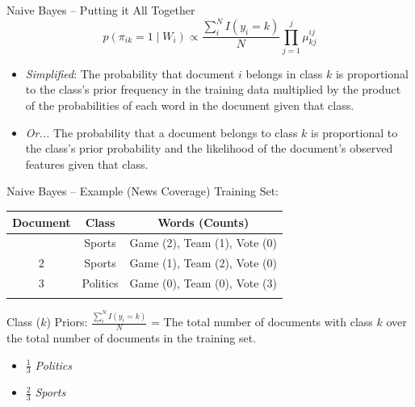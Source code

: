 \documentclass[
  ignorenonframetext,
  aspectratio=169]{beamer}
\begin{document}
\begin{frame}{Naive Bayes -- Putting it All Together}
\label{naive-bayes-putting-it-all-together}
\[p(\pi_{ik}=1\mid W_i) \propto \frac{\sum^N_i I(y_i=k)}{N} \prod^j_{j=1} \mu_{kj}^{ij}\]
\vspace{2.5mm}

\begin{itemize}
\item \textit{Simplified}: The probability that document $i$ belongs in class $k$ is proportional to the class's prior frequency in the training data multiplied by the product of the probabilities of each word in the document given that class.  \vspace{2.5mm}
\item \textit{Or...} The probability that a document belongs to class $k$ is proportional to the class's prior probability and the likelihood of the document's observed features given that class.
\end{itemize}
\end{frame}

\begin{frame}{Naive Bayes -- Example (News Coverage)}
\label{naive-bayes-example-news-coverage}
Training Set: \vspace{2.5mm}

\begin{longtable}[]{@{}ccc@{}}
\toprule\noalign{}
Document & Class & Words (Counts) \\
\midrule\noalign{}
\endhead
1 & Sports & Game (2), Team (1), Vote (0) \\
2 & Sports & Game (1), Team (2), Vote (0) \\
3 & Politics & Game (0), Team (0), Vote (3) \\
\bottomrule\noalign{}
\end{longtable}

\vspace{2.5mm}

Class (\(k\)) Priors: \(\frac{\sum^N_i I(y_i=k)}{N}\) = The total number
of documents with class \(k\) over the total number of documents in the
training set. \pause

\begin{itemize}
\item $\frac{1}{3}$ \textit{Politics} 
\item $\frac{2}{3}$ \textit{Sports} 
\end{itemize}
\end{frame}
\end{document}
